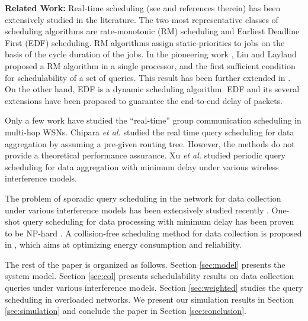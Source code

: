 \documentclass[conference,10pt]{IEEEtran}\usepackage{amsmath}
\def\etal{\textit{et al.}\xspace}
\begin{document}
\textbf{Related Work:}
\label{sec:review}
Real-time scheduling (see \cite{liu2000real} and references
therein) has been extensively studied in the literature.
The two most representative classes of scheduling algorithms are
rate-monotonic (RM) scheduling and Earliest Deadline First (EDF) scheduling.
RM algorithms assign static-priorities to jobs on
 the basis of the cycle duration of the jobs.
In the pioneering work \cite{liu-layland-jacm73},
 Liu and Layland  proposed a RM
 algorithm in a single processor,
 and the first sufficient condition for schedulability of a set of queries.
This result has been further extended in
\cite{leung1982complexity,shih1993modified}.
On the other hand, EDF is a dynamic scheduling algorithm. EDF and
its several extensions \cite{sivaraman2000traffic,sivaraman2000providing,sivaraman2001end}
 have been proposed 
 to guarantee the end-to-end delay of packets.

Only a few work
 have studied  the ``real-time''
 group communication scheduling in multi-hop WSNs.
Chipara \etal\cite{chipara2006dynamic, chipara2007real} studied the
 real time query scheduling for data aggregation by assuming a pre-given routing
 tree. However, the methods do not provide a theoretical performance
 assurance.
Xu \etal \cite{xu2012efficient} studied periodic query scheduling for
data aggregation with minimum delay under various wireless interference models.

The problem of sporadic query scheduling in the network for data
 collection under various interference models has
 been extensively studied recently
 \cite{wang2010tosn,annamalai2003tbc,gandham2006dmt,kesselman2006fda,upadhyayula2003lla}.
One-shot query scheduling for data processing with
 minimum delay has been proven
 to be NP-hard \cite{annamalai2003tbc,gandham2006dmt,kesselman2006fda}.
A collision-free scheduling method for data collection is proposed
 in \cite{lee2008teo}, which aims at optimizing energy consumption and reliability.

The rest of the paper is organized as follows. Section
\ref{sec:model} presents the system model.
Section \ref{sec:col}
 presents schedulability results on data collection queries under various interference models.
Section \ref{sec:weighted} studies the query scheduling in
overloaded networks. We present our simulation results in
 Section \ref{sec:simulation} and conclude the paper in Section
\ref{sec:conclusion}.
\end{document}
